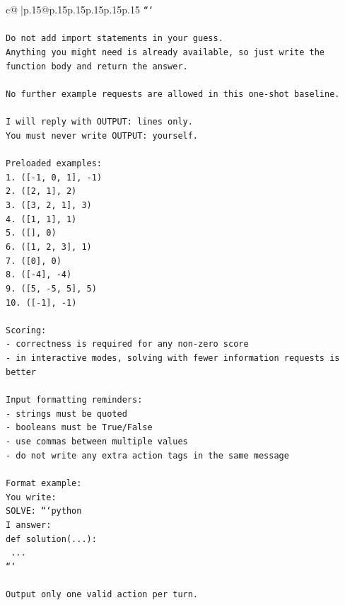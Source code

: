 \documentclass{article}
\begin{document}
{\begin{supertabular}{c@{$\;$}|p{.15\linewidth}@{}p{.15\linewidth}p{.15\linewidth}p{.15\linewidth}p{.15\linewidth}p{.15\linewidth}}
{{{\texttt{```} \\
\\ 
\texttt{Do not add import statements in your guess.} \\
\texttt{Anything you might need is already available, so just write the function body and return the answer.} \\
\\ 
\texttt{No further example requests are allowed in this one{-}shot baseline.} \\
\\ 
\texttt{I will reply with OUTPUT: lines only.} \\
\texttt{You must never write OUTPUT: yourself.} \\
\\ 
\texttt{Preloaded examples:} \\
\texttt{1. ({[}{-}1, 0, 1{]}, {-}1)} \\
\texttt{2. ({[}2, 1{]}, 2)} \\
\texttt{3. ({[}3, 2, 1{]}, 3)} \\
\texttt{4. ({[}1, 1{]}, 1)} \\
\texttt{5. ({[}{]}, 0)} \\
\texttt{6. ({[}1, 2, 3{]}, 1)} \\
\texttt{7. ({[}0{]}, 0)} \\
\texttt{8. ({[}{-}4{]}, {-}4)} \\
\texttt{9. ({[}5, {-}5, 5{]}, 5)} \\
\texttt{10. ({[}{-}1{]}, {-}1)} \\
\\ 
\texttt{Scoring:} \\
\texttt{{-} correctness is required for any non{-}zero score} \\
\texttt{{-} in interactive modes, solving with fewer information requests is better} \\
\\ 
\texttt{Input formatting reminders:} \\
\texttt{{-} strings must be quoted} \\
\texttt{{-} booleans must be True/False} \\
\texttt{{-} use commas between multiple values} \\
\texttt{{-} do not write any extra action tags in the same message} \\
\\ 
\texttt{Format example:} \\
\texttt{You write:} \\
\texttt{SOLVE: ```python} \\
\texttt{I answer:} \\
\texttt{def solution(...):} \\
\texttt{    ...} \\
\texttt{```} \\
\\ 
\texttt{Output only one valid action per turn.} \\
            }
        }
    }
     \\ \\


\end{supertabular}}
\end{document}
